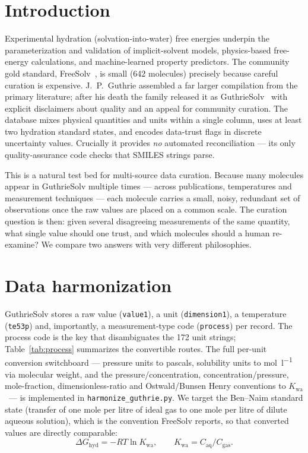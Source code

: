 \documentclass[11pt]{article}
\newcommand{\dGhyd}{\ensuremath{\Delta G_{\mathrm{hyd}}}}
\newcommand{\Kwa}{\ensuremath{K_{\mathrm{wa}}}}
\begin{document}
\section{Introduction}
Experimental hydration (solvation-into-water) free energies underpin the
parameterization and validation of implicit-solvent models, physics-based free-energy
calculations, and machine-learned property predictors. The community gold standard,
FreeSolv~\cite{freesolv}, is small (\num{642} molecules) precisely because careful
curation is expensive. J.~P.~Guthrie assembled a far larger compilation from the primary
literature; after his death the family released it as GuthrieSolv~\cite{guthriesolv} with
explicit disclaimers about quality and an appeal for community curation. The database
mixes physical quantities and units within a single column, uses at least two hydration
standard states, and encodes data-trust flags in discrete uncertainty values. Crucially it
provides \emph{no} automated reconciliation --- its only quality-assurance code checks that
SMILES strings parse.

This is a natural test bed for multi-source data curation. Because many molecules appear in
GuthrieSolv multiple times --- across publications, temperatures and measurement techniques
--- each molecule carries a small, noisy, redundant set of observations once the raw values
are placed on a common scale. The curation question is then: given several disagreeing
measurements of the same quantity, what single value should one trust, and which molecules
should a human re-examine? We compare two answers with very different philosophies.

\section{Data harmonization}
\label{sec:harm}
GuthrieSolv stores a raw value (\texttt{value1}), a unit (\texttt{dimension1}), a temperature
(\texttt{te53p}) and, importantly, a measurement-type code (\texttt{process}) per record. The
process code is the key that disambiguates the 172 unit strings; Table~\ref{tab:process}
summarizes the convertible routes. The full per-unit conversion switchboard --- pressure units
to pascals, solubility units to \si{\mol\per\litre} via molecular weight, and the
pressure/concentration, concentration/pressure, mole-fraction, dimensionless-ratio and
Ostwald/Bunsen Henry conventions to \Kwa\ --- is implemented in \texttt{harmonize\_guthrie.py}.
We target the Ben--Naim standard state (transfer of one
mole per litre of ideal gas to one mole per litre of dilute aqueous solution), which is the
convention FreeSolv reports, so that converted values are directly comparable:
\begin{equation}
\dGhyd = -RT \ln \Kwa, \qquad \Kwa = C_{\mathrm{aq}}/C_{\mathrm{gas}} .
\label{eq:bennaim}
\end{equation}
\end{document}
